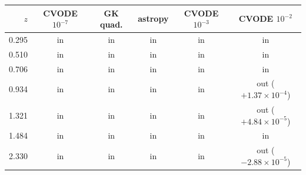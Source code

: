 \begin{tabular}{@{}rccccc@{}}\toprule
$z$ & CVODE $10^{-7}$ & GK quad. & astropy & CVODE $10^{-3}$ & CVODE $10^{-2}$ \\
\midrule
0.295 & in & in & in & in & in \\
0.510 & in & in & in & in & in \\
0.706 & in & in & in & in & in \\
0.934 & in & in & in & in & out ($+1.37\times10^{-4}$) \\
1.321 & in & in & in & in & out ($+4.84\times10^{-5}$) \\
1.484 & in & in & in & in & in \\
2.330 & in & in & in & in & out ($-2.88\times10^{-5}$) \\
\bottomrule
\end{tabular}
